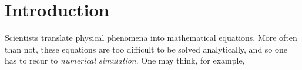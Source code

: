 \chapter*{Introduction}%
Scientists translate physical phenomena into mathematical equations.
More often than not,
these equations are too difficult to be solved analytically,
and so one has to recur to \emph{numerical simulation}.
One may think, for example,
